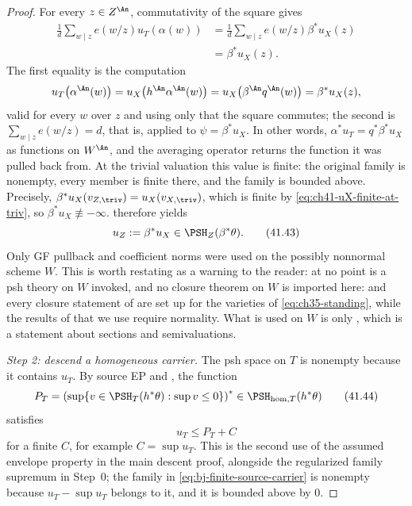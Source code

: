 \begin{proof}
For every $z\in Z^{\An}$, commutativity of the square gives
\[
 \begin{aligned}
 \frac1d\sum_{w\mid z}e(w/z)u_T(\alpha(w))
 &=\frac1d\sum_{w\mid z}e(w/z)\beta^*u_X(z)\\
 &=\beta^*u_X(z).
 \end{aligned}
\tag{41.42}\label{eq:bj-norm-stage-limit}
\]
The first equality is the computation
\[
 u_T\bigl(\alpha^{\An}(w)\bigr)
 =u_X\bigl(h^{\An}\alpha^{\An}(w)\bigr)
 =u_X\bigl(\beta^{\An}q^{\An}(w)\bigr)
 =\beta^*u_X(z),
\]
valid for every $w$ over $z$ and using only that the square commutes;
the second is $\sum_{w\mid z}e(w/z)=d$, that is,
 applied to $\psi=\beta^*u_X$.  In other
words, $\alpha^*u_T=q^*\beta^*u_X$ as functions on $W^{\An}$, and the
averaging operator returns the function it was pulled back from.
At the trivial valuation this value is finite: the original family is
nonempty, every member is finite there, and the family is bounded above.
Precisely, $\beta^*u_X(v_{Z,\triv})=u_X(v_{X,\triv})$, which is finite by
\eqref{eq:ch41-uX-finite-at-triv}, so $\beta^*u_X\not\equiv-\infty$.
 therefore yields
\[
                         u_Z:=\beta^*u_X
                         \in\PSH_Z(\beta^*\theta).
\tag{41.43}\label{eq:bj-uZ-psh}
\]
Only GF pullback and coefficient norms were used on the possibly nonnormal
scheme $W$.  This is worth restating as a warning to the reader: at no
point is a psh theory on $W$ invoked, and no closure theorem on $W$ is imported here:
 and every closure statement of
 are set up for the varieties of
\eqref{eq:ch35-standing}, while the results of
 that we use require normality.  What is used on
$W$ is only , which is a statement about
sections and semivaluations.

\medskip
\noindent\emph{Step 2: descend a homogeneous carrier.}
The psh space on $T$ is nonempty because it contains $u_T$.  By source
EP and , the function
\[
 P_T=
 \left(\sup\{v\in\PSH_T(h^*\theta):\sup v\le0\}\right)^*
 \in\PSH_{\mathrm{hom},T}(h^*\theta)
\tag{41.44}\label{eq:bj-finite-source-carrier}
\]
satisfies
\[
                              u_T\le P_T+C
\tag{41.45}\label{eq:bj-uT-carrier}
\]
for a finite $C$, for example $C=\sup u_T$.  This is the second use of the assumed envelope property in the main
descent proof, alongside the regularized family supremum in Step~0; the family in
\eqref{eq:bj-finite-source-carrier} is nonempty because
$u_T-\sup u_T$ belongs to it, and it is bounded above by $0$.


\end{proof}
